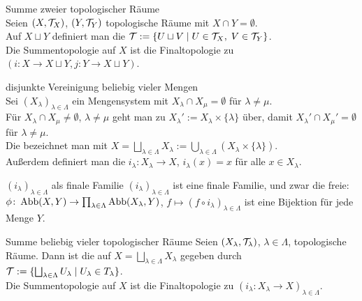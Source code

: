 \linie

\begin{Def}{Summe zweier topologischer Räume}\\
    Seien $(X, \mathcal{T}_X)$, $(Y, \mathcal{T}_Y)$ topologische Räume mit
    $X \cap Y = \emptyset$. \\
    Auf $X \sqcup Y$ definiert man die 
    $\mathcal{T} := \{U \sqcup V \;|\; U \in \mathcal{T}_X,\; V \in \mathcal{T}_Y\}$. \\
    Die Summentopologie auf $X$ ist die Finaltopologie zu
    $(i\colon X \rightarrow X \sqcup Y, j\colon Y \rightarrow X \sqcup Y)$.
\end{Def}

\linie
\pagebreak

\begin{Def}{disjunkte Vereinigung beliebig vieler Mengen}\\
    Sei $(X_\lambda)_{\lambda \in \Lambda}$ ein Mengensystem mit
    $X_\lambda \cap X_\mu = \emptyset$ für $\lambda \not= \mu$. \\
    Für $X_\lambda \cap X_\mu \not= \emptyset$, $\lambda \not= \mu$
    geht man zu $X_\lambda' := X_\lambda \times \{\lambda\}$
    über, damit $X_\lambda' \cap X_\mu' = \emptyset$ für
    $\lambda \not= \mu$. \\
    Die  bezeichnet man mit
    $X = \bigsqcup_{\lambda \in \Lambda} X_\lambda :=
    \bigcup_{\lambda \in \Lambda} (X_\lambda \times \{\lambda\})$. \\
    Außerdem definiert man die 
    $i_\lambda\colon X_\lambda \rightarrow X$, $i_\lambda(x) = x$
    für alle $x \in X_\lambda$.
\end{Def}

\begin{Satz}{$(i_\lambda)_{\lambda \in \Lambda}$ als finale Familie}
    $(i_\lambda)_{\lambda \in \Lambda}$ ist eine finale Familie,
    und zwar die freie: \\
    $\phi\colon \operatorname{Abb}(X, Y) \rightarrow
    \prod_{\lambda \in \Lambda} \operatorname{Abb}(X_\lambda, Y)$,
    $f \mapsto (f \circ i_\lambda)_{\lambda \in \Lambda}$
    ist eine Bijektion für jede Menge $Y$.
\end{Satz}

\linie

\begin{Def}{Summe beliebig vieler topologischer Räume}
    Seien $(X_\lambda, \mathcal{T}_\lambda)$, $\lambda \in \Lambda$, topologische Räume.
    Dann ist die  auf
    $X = \bigsqcup_{\lambda \in \Lambda} X_\lambda$ gegeben durch
    $\mathcal{T} := \{\bigsqcup_{\lambda \in \Lambda} U_\lambda \;|\;
    U_\lambda \in T_\lambda\}$. \\
    Die Summentopologie auf $X$ ist die Finaltopologie zu
    $(i_\lambda\colon X_\lambda \rightarrow X)_{\lambda \in \Lambda}$.
\end{Def}

